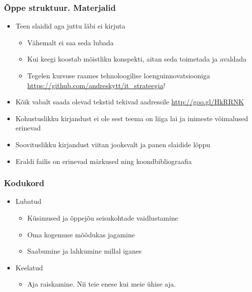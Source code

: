 \begin{frame}[fragile]
  \frametitle{Õppe struktuur. Materjalid}
	\begin{itemize}
		\item Teen slaidid aga juttu läbi ei kirjuta
		\begin{itemize}
			\item Vähemalt ei saa seda lubada
			\item Kui keegi koostab mõistliku konspekti, aitan seda toimetada ja avaldada
			\item Tegelen kursuse raames tehnoloogilise loenguinnovatsiooniga \url{https://github.com/andreskytt/it_strateegia}!
		\end{itemize}
		\item Kõik vabalt saada olevad tekstid tekivad aadressile \url{http://goo.gl/HkRRNK}
		\item Kohustuslikku kirjandust ei ole sest teema on liiga lai ja inimeste võimalused erinevad
		\item Soovituslikku kirjandust viitan jooksvalt ja panen slaidide lõppu 
		\item Eraldi failis on erinevad märkused ning koondbibliograafia
	\end{itemize}
\end{frame}


\begin{frame}[fragile]
  \frametitle{Kodukord}
	\begin{itemize}
		\item Lubatud
		\begin{itemize}
			\item Küsimused ja õppejõu seisukohtade vaidlustamine
			\item Oma kogemuse mõõdukas jagamine
			\item Saabumine ja lahkumine millal iganes
		\end{itemize}
		\item Keelatud
		\begin{itemize}
			\item Aja raiskamine. Nii teie enese kui meie ühise aja.
		\end{itemize}
	\end{itemize}
\end{frame}

